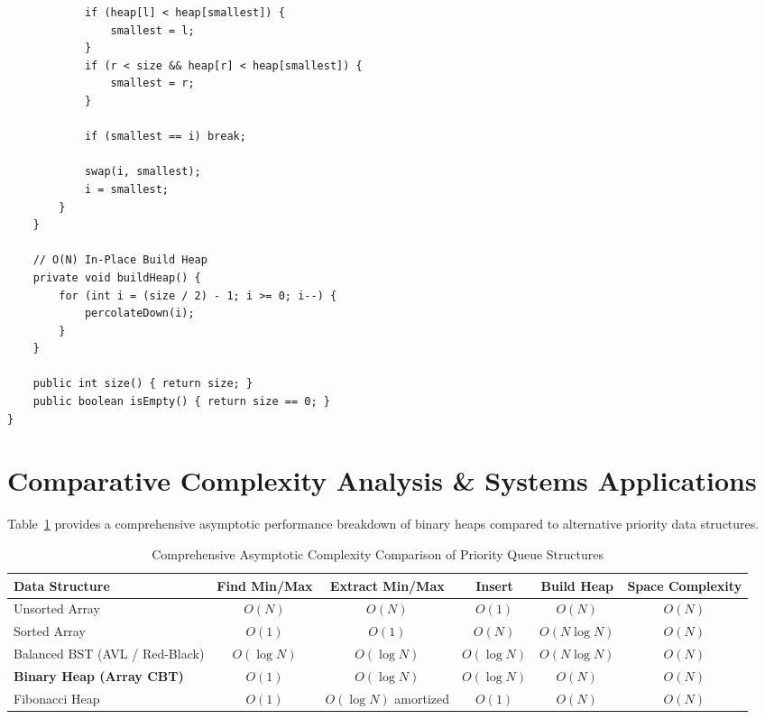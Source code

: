 \documentclass[10pt,journal,compsoc,onecolumn]{IEEEtran}
\begin{document}
\begin{verbatim}
            if (heap[l] < heap[smallest]) {
                smallest = l;
            }
            if (r < size && heap[r] < heap[smallest]) {
                smallest = r;
            }

            if (smallest == i) break;

            swap(i, smallest);
            i = smallest;
        }
    }

    // O(N) In-Place Build Heap
    private void buildHeap() {
        for (int i = (size / 2) - 1; i >= 0; i--) {
            percolateDown(i);
        }
    }

    public int size() { return size; }
    public boolean isEmpty() { return size == 0; }
}
\end{verbatim}

\section{Comparative Complexity Analysis \& Systems Applications}
\label{sec:complexity-applications}

Table~\ref{tab:heap-complexity} provides a comprehensive asymptotic performance breakdown of binary heaps compared to alternative priority data structures.

\begin{table}[htbp]
\centering
\caption{Comprehensive Asymptotic Complexity Comparison of Priority Queue Structures}
\label{tab:heap-complexity}
\begin{tabular}{lccccc}
\toprule
\textbf{Data Structure} & \textbf{Find Min/Max} & \textbf{Extract Min/Max} & \textbf{Insert} & \textbf{Build Heap} & \textbf{Space Complexity} \\
\midrule
Unsorted Array & $O(N)$ & $O(N)$ & $O(1)$ & $O(N)$ & $O(N)$ \\
Sorted Array & $O(1)$ & $O(1)$ & $O(N)$ & $O(N \log N)$ & $O(N)$ \\
Balanced BST (AVL / Red-Black) & $O(\log N)$ & $O(\log N)$ & $O(\log N)$ & $O(N \log N)$ & $O(N)$ \\
\textbf{Binary Heap (Array CBT)} & $O(1)$ & $O(\log N)$ & $O(\log N)$ & \textbf{$O(N)$} & $O(N)$ \\
Fibonacci Heap & $O(1)$ & $O(\log N)$ amortized & $O(1)$ & $O(N)$ & $O(N)$ \\
\bottomrule
\end{tabular}
\end{table}
\end{document}
